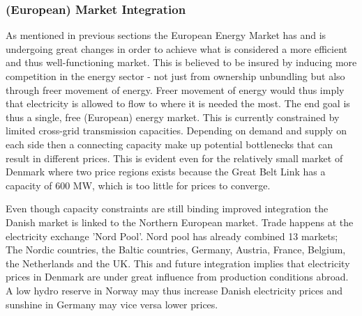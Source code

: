 

\subsubsection{(European) Market Integration}
\label{subsec:t_EU}
As mentioned in previous sections the European Energy Market has and is undergoing great changes in order to achieve what is considered a more efficient and thus well-functioning market. This is believed to be insured by inducing more competition in the energy sector - not just from ownership unbundling but also through freer movement of energy. Freer movement of energy would thus imply that electricity is allowed to flow to where it is needed the most. The end goal is thus a single, free (European) energy market. This is currently constrained by limited cross-grid transmission capacities. Depending on demand and supply on each side then a connecting capacity make up potential bottlenecks that can result in different prices.%
This is evident even for the relatively small market of Denmark where two price regions exists because the Great Belt Link has a capacity of 600 MW, which is too little for prices to converge.
\medskip

Even though capacity constraints are still binding improved integration the Danish market is linked to the Northern European market. Trade happens at the electricity exchange 'Nord Pool'. Nord pool has already combined 13 markets; The Nordic countries, the Baltic countries, Germany, Austria, France, Belgium, the Netherlands and the UK.  This and future integration implies that electricity prices in Denmark are under great influence from production conditions abroad. A low hydro reserve in Norway may thus increase Danish electricity prices and sunshine in Germany may vice versa lower prices.
\medskip

